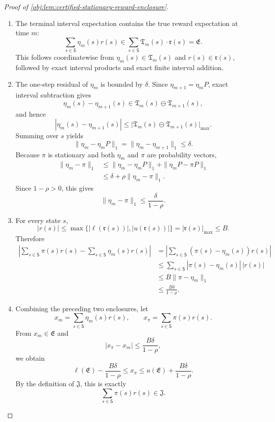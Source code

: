 \begin{proof}[Proof of \cref{obj:lem:certified-stationary-reward-enclosure}]
\begin{enumerate}
\item The terminal interval expectation contains the true reward expectation at time \(m\):
\[
\sum_{s\in\mathsf S}\eta_m(s)r(s)
   \in
\sum_{s\in\mathsf S}\mathfrak T_m(s)\cdot\mathfrak r(s)
   =\mathfrak E.
\]
This follows coordinatewise from \(\eta_m(s)\in\mathfrak T_m(s)\) and \(r(s)\in\mathfrak r(s)\), followed by exact interval products and exact finite interval addition. %

\item The one-step residual of \(\eta_m\) is bounded by \(\delta\).  Since \(\eta_{m+1}=\eta_mP\), exact interval subtraction gives
\[
\eta_m(s)-\eta_{m+1}(s)
   \in \mathfrak T_m(s)\ominus\mathfrak T_{m+1}(s),
\]
and hence
\[
|\eta_m(s)-\eta_{m+1}(s)|
   \le \bigl|\mathfrak T_m(s)\ominus\mathfrak T_{m+1}(s)\bigr|_{\max}.
\]
Summing over \(s\) yields
\[
\|\eta_m-\eta_mP\|_1
   =\|\eta_m-\eta_{m+1}\|_1
   \le \delta.
\]
Because \(\pi\) is stationary and both \(\eta_m\) and \(\pi\) are probability vectors,
\[
\begin{aligned}
\|\eta_m-\pi\|_1
&\le \|\eta_m-\eta_mP\|_1+\|\eta_mP-\pi P\|_1\\
&\le \delta+\rho\|\eta_m-\pi\|_1 .
\end{aligned}
\]
Since \(1-\rho>0\), this gives
\[
\|\eta_m-\pi\|_1\le \frac{\delta}{1-\rho}.
\]

\item For every state \(s\),
\[
|r(s)|
   \le \max\{|\ell(\mathfrak r(s))|,|u(\mathfrak r(s))|\}
   =|\mathfrak r(s)|_{\max}
   \le B.
\]
Therefore
\[
\begin{aligned}
\left|
\sum_{s\in\mathsf S}\pi(s)r(s)
-
\sum_{s\in\mathsf S}\eta_m(s)r(s)
\right|
&=
\left|\sum_{s\in\mathsf S}(\pi(s)-\eta_m(s))r(s)\right|\\
&\le \sum_{s\in\mathsf S}|\pi(s)-\eta_m(s)|\,|r(s)|\\
&\le B\|\pi-\eta_m\|_1\\
&\le \frac{B\delta}{1-\rho}.
\end{aligned}
\]

\item Combining the preceding two enclosures, let
\[
x_m=\sum_{s\in\mathsf S}\eta_m(s)r(s),
\qquad
x_\pi=\sum_{s\in\mathsf S}\pi(s)r(s).
\]
From \(x_m\in\mathfrak E\) and
\[
|x_\pi-x_m|\le \frac{B\delta}{1-\rho},
\]
we obtain
\[
\ell(\mathfrak E)-\frac{B\delta}{1-\rho}
\le x_\pi\le
u(\mathfrak E)+\frac{B\delta}{1-\rho}.
\]
By the definition of \(\mathfrak J\), this is exactly
\[
\sum_{s\in\mathsf S}\pi(s)r(s)\in\mathfrak J .
\]
\end{enumerate}
\end{proof}
